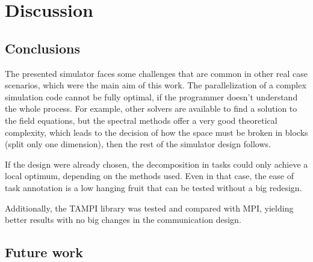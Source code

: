\chapter{Discussion}


\section{Conclusions}

The presented simulator faces some challenges that are common in other real case 
scenarios, which were the main aim of this work. The parallelization of a 
complex simulation code cannot be fully optimal, if the programmer doesn't 
understand the whole process. For example, other solvers are available to find a 
solution to the field equations, but the spectral methods offer a very good 
theoretical complexity, which leads to the decision of how the space must be 
broken in blocks (split only one dimension), then the rest of the simulator 
design follows.

If the design were already chosen, the decomposition in tasks could only achieve 
a local optimum, depending on the methods used. Even in that case, the ease of 
task annotation is a low hanging fruit that can be tested without a big 
redesign.

Additionally, the TAMPI library was tested and compared with MPI, yielding 
better results with no big changes in the communication design.


\section{Future work}

